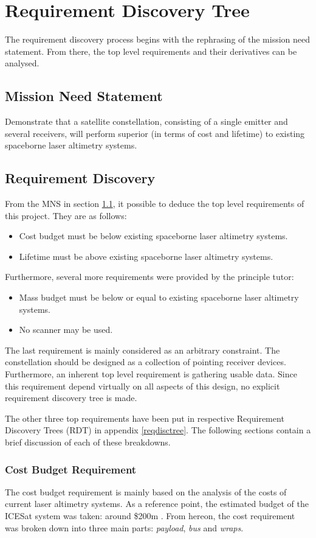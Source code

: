 \section{Requirement Discovery Tree}
\label{blRDT}
The requirement discovery process begins with the rephrasing of the mission need statement. From there, the top level requirements and their derivatives can be analysed.
\subsection{Mission Need Statement}
\label{dsePPMNS}
Demonstrate that a satellite constellation, consisting of a single emitter and several receivers, will perform superior (in terms of cost and lifetime) to existing spaceborne laser altimetry systems.
\subsection{Requirement Discovery}
\label{blReqDesq}
From the \ac{MNS} in section \ref{dsePPMNS}, it possible to deduce the top level requirements of this project. They are as follows:
\begin{itemize}
	\item Cost budget must be below existing spaceborne laser altimetry systems.
	\item Lifetime must be above existing spaceborne laser altimetry systems.
\end{itemize}
Furthermore, several more requirements were provided by the principle tutor:
\begin{itemize}
	\item Mass budget must be below or equal to existing spaceborne laser altimetry systems.
	\item No scanner may be used.
\end{itemize}
The last requirement is mainly considered as an arbitrary constraint. The constellation should be designed as a collection of pointing receiver devices. Furthermore, an inherent top level requirement is gathering usable data. Since this requirement depend virtually on all aspects of this design, no explicit requirement discovery tree is made.

The other three top requirements have been put in respective Requirement Discovery Trees (RDT) in appendix \ref{reqdisctree}. The following sections contain a brief discussion of each of these breakdowns.
\subsubsection{Cost Budget Requirement}
\label{blCBR}
The cost budget requirement is mainly based on the analysis of the costs of current laser altimetry systems. As a reference point, the estimated budget of the ICESat system was taken: around \$200m \cite{icesatc98a}. From hereon, the cost requirement was broken down into three main parts: \emph{payload}, \emph{bus} and \emph{wraps}. 

